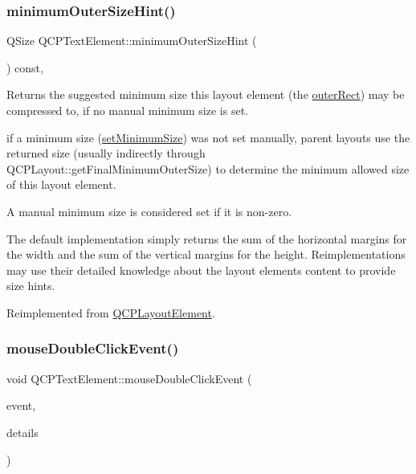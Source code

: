 \mbox{\label{classQCPTextElement_a47b8541f55ff520c557e0f27461f109e}} 
\subsubsection{\texorpdfstring{minimum\+Outer\+Size\+Hint()}{minimumOuterSizeHint()}}
{\footnotesize\ttfamily Q\+Size Q\+C\+P\+Text\+Element\+::minimum\+Outer\+Size\+Hint (\begin{DoxyParamCaption}{ }\end{DoxyParamCaption}) const\hspace{0.3cm}{\ttfamily [protected]}, {\ttfamily [virtual]}}

Returns the suggested minimum size this layout element (the \hyperlink{classQCPLayoutElement_a2a32a12a6161c9dffbadeb9cc585510c}{outer\+Rect}) may be compressed to, if no manual minimum size is set.

if a minimum size (\hyperlink{classQCPLayoutElement_a5dd29a3c8bc88440c97c06b67be7886b}{set\+Minimum\+Size}) was not set manually, parent layouts use the returned size (usually indirectly through Q\+C\+P\+Layout\+::get\+Final\+Minimum\+Outer\+Size) to determine the minimum allowed size of this layout element.

A manual minimum size is considered set if it is non-\/zero.

The default implementation simply returns the sum of the horizontal margins for the width and the sum of the vertical margins for the height. Reimplementations may use their detailed knowledge about the layout element\textquotesingle{}s content to provide size hints. 

Reimplemented from \hyperlink{classQCPLayoutElement_a46789036c4fcb190fa374f91321d7c09}{Q\+C\+P\+Layout\+Element}.

\mbox{\label{classQCPTextElement_a2272ff775ab385f612e9fd39773de7c0}} 
\subsubsection{\texorpdfstring{mouse\+Double\+Click\+Event()}{mouseDoubleClickEvent()}}
{\footnotesize\ttfamily void Q\+C\+P\+Text\+Element\+::mouse\+Double\+Click\+Event (\begin{DoxyParamCaption}\item[{Q\+Mouse\+Event $\ast$}]{event,  }\item[{const Q\+Variant \&}]{details }\end{DoxyParamCaption})\hspace{0.3cm}{\ttfamily [virtual]}}

